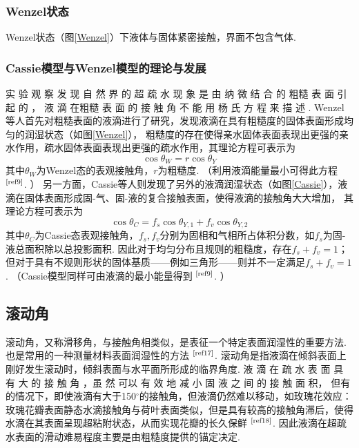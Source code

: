 \documentclass[a4paper,12pt]{article}%
\begin{document}
\subsubsection{Wenzel状态}
Wenzel状态（图\ref{Wenzel}）下液体与固体紧密接触，界面不包含气体. 

\subsubsection{Cassie模型与Wenzel模型的理论与发展}
\begin{spacing}{1.528}%
实 验 观 察 发 现 自 然 界 的 超 疏 水 现 象 是 由 纳 微 结 合 的 粗糙 表 面 引 起 的 ， 液 滴 在粗糙 表 面 的 接 触 角 不 能 用 杨 氏 方 程 来 描 述 . 
Wenzel等人首先对粗糙表面的液滴进行了研究，发现液滴在具有粗糙度的固体表面形成均匀的润湿状态（如图\ref{Wenzel}），
粗糙度的存在使得亲水固体表面表现出更强的亲水作用，疏水固体表面表现出更强的疏水作用，其理论方程可表示为
\begin{equation}
    \cos\theta_W=r\cos\theta_Y
\end{equation}
其中$\theta_W$为Wenzel态的表观接触角，$r$为粗糙度. （利用液滴能量最小可得此方程
$^\text{\cite{ref9}}$. ）
另一方面，Cassie等人则发现了另外的液滴润湿状态（如图\ref{Cassie}），液滴在固体表面形成固-气、固-液的复合接触表面，使得液滴的接触角大大增加，
其理论方程可表示为
\begin{equation}
    \cos\theta_C=f_s\cos\theta_{Y,1}+f_v\cos\theta_{Y,2}
\end{equation}
其中$\theta _C$为Cassie态表观接触角，$f_s,f_v$分别为固相和气相所占体积分数，如$f_s$为固-液总面积除以总投影面积. 
因此对于均匀分布且规则的粗糙度，存在$f_s+f_v=1$；但对于具有不规则形状的固体基质——例如三角形——则并不一定满足$f_s+f_v=1$. 
（Cassie模型同样可由液滴的最小能量得到
$^\text{\cite{ref9}}$. ）
\end{spacing}

\subsection{滚动角}
\begin{spacing}{1.528}%
滚动角，又称滑移角，与接触角相类似，是表征一个特定表面润湿性的重要方法. 也是常用的一种测量材料表面润湿性的方法
$^\text{\cite{ref17}}$. 
滚动角是指液滴在倾斜表面上刚好发生滚动时，倾斜表面与水平面所形成的临界角度.
液 滴 在 疏 水 表 面 具 有 大 的 接 触 角 ，虽 然 可以 有 效 地 减 小 固 液 之 间 的 接 触 面 积，
但有的情况下，即使液滴有大于150$^{\circ}$的接触角，但液滴仍然难以移动，如玫瑰花效应：
玫瑰花瓣表面静态水滴接触角与荷叶表面类似，但是具有较高的接触角滞后，使得水滴在其表面呈现超粘附状态，从而实现花瓣的长久保鲜
$^\text{\cite{ref18}}$. 
因此液滴在超疏水表面的滑动难易程度主要是由粗糙度提供的锚定决定. 
\end{spacing}
\end{document}
